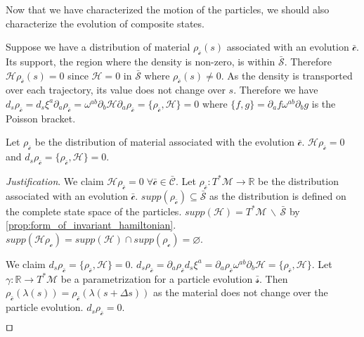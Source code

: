 \documentclass[smallextended]{svjour3}
\numberwithin{equation}{section}
\newenvironment{justification}{\emph{Justification}.}{\hfill\(\qed\)}
\begin{document}
Now that we have characterized the motion of the particles, we should also characterize the evolution of composite states.

Suppose we have a distribution of material $\rho_{\bar{\mathcal{c}}}(s)$ associated with an evolution $\bar{\mathcal{c}}$. Its support, the region where the density is non-zero, is within $\bar{\mathcal{S}}$. Therefore  $\mathcal{H} \rho_{\bar{\mathcal{c}}}(s) = 0$ since $\mathcal{H} = 0$ in $\bar{\mathcal{S}}$ where $\rho_{\bar{\mathcal{c}}}(s) \neq 0$. As the density is transported over each trajectory, its value does not change over $s$. Therefore we have $d_s \rho_{\bar{\mathcal{c}}}= d_s \xi^a \partial_a \rho_{\bar{\mathcal{c}}} = \omega^{ab} \partial_b \mathcal{H} \partial_a \rho_{\bar{\mathcal{c}}} = \{ \rho_{\bar{\mathcal{c}}}, \mathcal{H} \} = 0$ where $\{f , g\} = \partial_a f \omega^{ab} \partial_b g$ is the Poisson bracket.

\begin{prop}\label{prop:relativistic_state_evolution}
	Let $\rho_{\bar{\mathcal{c}}}$ be the distribution of material associated with the evolution $\bar{\mathcal{c}}$. $\mathcal{H} \rho_{\bar{\mathcal{c}}} = 0$ and $d_s \rho_{\bar{\mathcal{c}}} = \{ \rho_{\bar{\mathcal{c}}}, \mathcal{H} \} = 0$.
\end{prop}

\begin{justification}
	We claim $\mathcal{H} \rho_{\bar{\mathcal{c}}} = 0 \; \forall \bar{\mathcal{c}} \in \bar{\mathcal{C}}$. Let $\rho_{\bar{\mathcal{c}}} : T^*\mathcal{M} \rightarrow \mathbb{R}$ be the distribution associated with an evolution $\bar{\mathcal{c}}$. $supp(\rho_{\bar{\mathcal{c}}}) \subseteq \bar{\mathcal{S}}$ as the distribution is defined on the complete state space of the particles. $supp(\mathcal{H}) = T^*\mathcal{M} \,\backslash\, \bar{\mathcal{S}}$ by \ref{prop:form_of_invariant_hamiltonian}. $supp(\mathcal{H} \rho_\mathcal{c}) = supp(\mathcal{H}) \cap supp(\rho_\mathcal{c}) = \varnothing$.
	
	We claim $d_s \rho_{\bar{\mathcal{c}}} = \{ \rho_{\bar{\mathcal{c}}}, \mathcal{H} \} = 0$. $d_s \rho_{\bar{\mathcal{c}}}= \partial_a \rho_{\bar{\mathcal{c}}} d_s \xi^a = \partial_a \rho_{\bar{\mathcal{c}}} \omega^{ab} \partial_b \mathcal{H} = \{ \rho_{\bar{\mathcal{c}}}, \mathcal{H} \}$. Let $\gamma : \mathbb{R} \rightarrow T^*\mathcal{M}$ be a parametrization for a particle evolution $\bar{\mathcal{s}}$. Then $\rho_{\bar{\mathcal{c}}}(\lambda(s)) = \rho_{\bar{\mathcal{c}}}(\lambda(s + \Delta s))$ as the material does not change over the particle evolution. $d_s \rho_{\bar{\mathcal{c}}} = 0$.
	
\end{justification}
\end{document}
